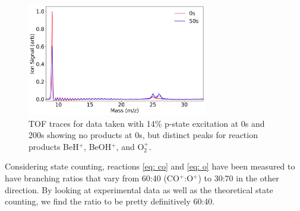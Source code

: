 \begin{figure}[H]
	\centering
	\includegraphics[width=0.7\textwidth]{images/Be_O2_no_laser_TOF.png}
	\caption{\label{fig: non laser TOF} TOF traces for data taken with 14\% p-state excitation at 0s and 200s showing no products at 0s, but distinct peaks for reaction products BeH$^+$, BeOH$^+$, and O$_2^+$.}
\end{figure}

Considering state counting, reactions \ref{eq: co} and \ref{eq: o} have been measured to have branching ratios that vary from 60:40 (CO$^+$:O$^+$) to 30:70 in the other direction. By looking at experimental data as well as the theoretical state counting, we find the ratio to be pretty definitively 60:40.
